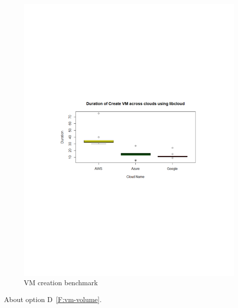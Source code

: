 \begin{figure}[!ht]
  \centering
  \includegraphics[width=\columnwidth]{images/CreateVM.pdf}
  \caption{VM creation benchmark}\label{F:vm-create}
\end{figure}

About option D~\ref{F:vm-volume}.

